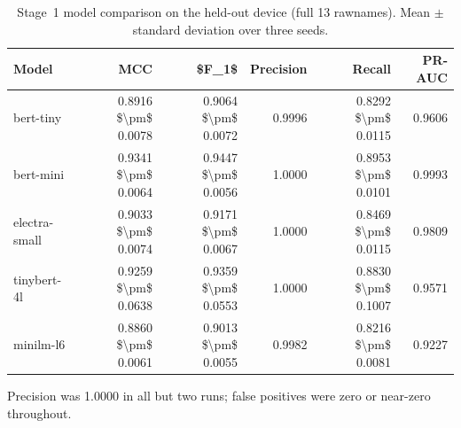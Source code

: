 \begin{table}[htbp]
\centering
\caption{Stage~1 model comparison on the held-out device (full 13 rawnames). Mean $\pm$ standard deviation over three seeds.}
\label{tab:model-comparison}
\small
\begin{tabular}{lrrrrr}
\toprule
Model & MCC & \$F\_1\$ & Precision & Recall & PR-AUC \\
\midrule
bert-tiny & 0.8916 \$\textbackslash pm\$ 0.0078 & 0.9064 \$\textbackslash pm\$ 0.0072 & 0.9996 & 0.8292 \$\textbackslash pm\$ 0.0115 & 0.9606 \\
bert-mini & 0.9341 \$\textbackslash pm\$ 0.0064 & 0.9447 \$\textbackslash pm\$ 0.0056 & 1.0000 & 0.8953 \$\textbackslash pm\$ 0.0101 & 0.9993 \\
electra-small & 0.9033 \$\textbackslash pm\$ 0.0074 & 0.9171 \$\textbackslash pm\$ 0.0067 & 1.0000 & 0.8469 \$\textbackslash pm\$ 0.0115 & 0.9809 \\
tinybert-4l & 0.9259 \$\textbackslash pm\$ 0.0638 & 0.9359 \$\textbackslash pm\$ 0.0553 & 1.0000 & 0.8830 \$\textbackslash pm\$ 0.1007 & 0.9571 \\
minilm-l6 & 0.8860 \$\textbackslash pm\$ 0.0061 & 0.9013 \$\textbackslash pm\$ 0.0055 & 0.9982 & 0.8216 \$\textbackslash pm\$ 0.0081 & 0.9227 \\
\bottomrule
\end{tabular}

\vspace{2pt}
\footnotesize Precision was 1.0000 in all but two runs; false positives were zero or near-zero throughout.
\end{table}
